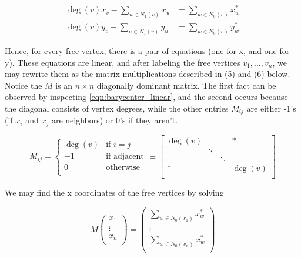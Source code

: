 \documentclass[11pt]{report}
\begin{document}
\begin{equation}\label{eqn:barycenter_linear}
    \begin{aligned}
        \deg{(v)}x_v - \sum_{u \in N_1(v)} x_u &= \sum_{w \in N_0(v)} x^*_w \\
        \deg{(v)}y_v - \sum_{u \in N_1(v)} y_u &= \sum_{w \in N_0(v)} y^*_w
    \end{aligned}
\end{equation}

Hence, for every free vertex, there is a pair of equations (one for x, and one for y). These equations are linear, and after labeling the free vertices $v_1, ..., v_n$, we may rewrite them as the matrix multiplications described in (5) and (6) below. Notice the $M$ is an $n \times n$ diagonally dominant matrix. The first fact can be observed by inspecting \ref{eqn:barycenter_linear}, and the second occurs because the diagonal consists of vertex degrees, while the other entries $M_{ij}$ are either -1's (if $x_i$ and $x_j$ are neighbors) or 0's if they aren't.

\begin{equation}\label{eqn:barycenter_matrix}
    M_{ij} = \begin{cases}
    \deg(v) &{\text{if $i = j$}} \\
    -1      &{\text{if adjacent}} \\
    0       &{\text{otherwise}} \\
    \end{cases}
    \equiv
    \begin{bmatrix}
    \deg(v) &        &        & * \\
            & \ddots &        & \\
            &        & \ddots & \\
    *       &        &        & \deg(v) \\
    \end{bmatrix}
\end{equation}

We may find the x coordinates of the free vertices by solving

\begin{equation}\label{eqn:barycenter_matrix_x}
    M \begin{pmatrix}
        x_1 \\ \vdots \\ x_n \\
    \end{pmatrix} =
    \begin{pmatrix}
        \sum_{w \in N_0(x_1)} x^*_w \\
        \vdots \\
        \sum_{w \in N_0(x_n)} x^*_w \\
    \end{pmatrix}
\end{equation}
\end{document}
